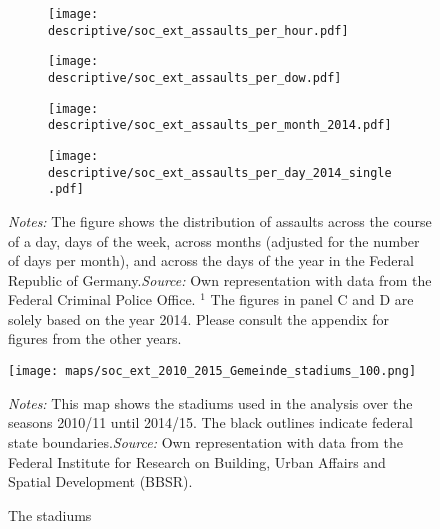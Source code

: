 \documentclass[11pt, a4paper]{article} %
\begin{document}
\vspace*{\fill}
\begin{figure}[H]\centering
	\caption{Distribution of assaults across time}\label{fig_soc_ext:assault_time_distribution_2014}
	\begin{subfigure}[h]{0.48\linewidth}\centering
		\texttt{[image: descriptive/soc\_ext\_assaults\_per\_hour.pdf]}
	\end{subfigure}
	\begin{subfigure}[h]{0.48\linewidth}\centering
		\texttt{[image: descriptive/soc\_ext\_assaults\_per\_dow.pdf]}
	\end{subfigure}

	\begin{subfigure}[h]{0.48\linewidth}\centering
		\texttt{[image: descriptive/soc\_ext\_assaults\_per\_month\_2014.pdf]}
	\end{subfigure}
	\begin{subfigure}[h]{0.48\linewidth}\centering
		\texttt{[image: descriptive/soc\_ext\_assaults\_per\_day\_2014\_single.pdf]}
	\end{subfigure}
	\begin{minipage}{\linewidth}
		\scriptsize{\emph{Notes:} The figure shows the distribution of assaults across the course of a day, days of the week, across months (adjusted for the number of days per month), and across the days of the year in the Federal Republic of Germany.\newline \emph{Source:} Own representation with data from the Federal Criminal Police Office.\newline \hspace{1 em} $^1$ The figures in panel C and D are solely based on the year 2014. Please consult the appendix for figures from the other years.}
	\end{minipage}
\end{figure}
\vspace*{\fill}\clearpage



\vspace*{\fill}
\begin{figure}[H]\centering
	\caption{The stadiums}\label{fig_soc_ext:map_gem_stadiums}
	\texttt{[image: maps/soc\_ext\_2010\_2015\_Gemeinde\_stadiums\_100.png]}
	\begin{minipage}{0.95\linewidth}
		\scriptsize{\emph{Notes:} This map shows the stadiums used in the analysis over the seasons 2010/11 until 2014/15. The black outlines indicate federal state boundaries.\newline \emph{Source:} Own representation with data from the Federal Institute for Research on Building, Urban Affairs and Spatial Development (BBSR).}
	\end{minipage}
\end{figure}
\vspace*{\fill}\clearpage
\end{document}
